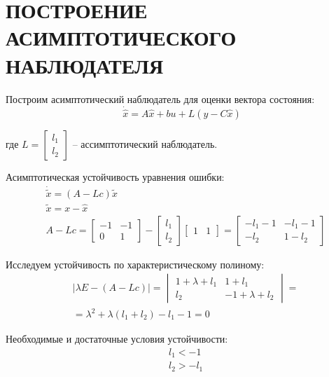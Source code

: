 \chapter{\MakeUppercase{Построение асимптотического наблюдателя}}

Построим асимптотический наблюдатель для оценки вектора состояния:
$$
\dot{\hat{x}}=A \hat{x} + b u + L(y - C \hat{x}) 
$$

\noindent где $ L = \begin{bmatrix} l_1 \\ l_2 \end{bmatrix} $ -- ассимптотический наблюдатель.

\noindent Асимптотическая устойчивость уравнения ошибки:
\begin{align*}
    &\dot{\tilde{x}}=(A-Lc)\tilde{x} \\
    &\tilde{x} = x - \hat{x} \\
    &A-Lc = \begin{bmatrix} -1 & -1 \\ 0 & 1 \end{bmatrix} - \begin{bmatrix} l_1 \\ l_2 \end{bmatrix} \begin{bmatrix} 1 & 1 \end{bmatrix} = 
        \begin{bmatrix}
         -l_1-1 & -l_1-1 \\
         -l_2 & 1-l_2
        \end{bmatrix}
\end{align*}

\noindent Исследуем устойчивость по характеристическому полиному:
\begin{align*}
    &| \lambda E - (A-Lc) | = \begin{vmatrix}
        1+\lambda+l_1 & 1 + l_1 \\
        l_2 & -1 + \lambda + l_2
    \end{vmatrix} = \\
    & = \lambda^2 + \lambda  \left(l_1+l_2\right)-l_1-1 = 0
\end{align*}

\noindent Необходимые и достаточные условия устойчивости:
\begin{align*}
    &l_1 < -1 \\
    &l_2 > -l_1
\end{align*}



